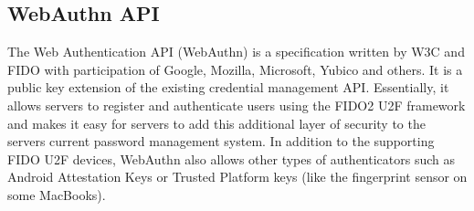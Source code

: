 \documentclass[acmtog,review]{acmart}
\begin{document}




\subsection{WebAuthn API}
The Web Authentication API (WebAuthn) is a specification written by W3C and FIDO with participation of Google, Mozilla, Microsoft, Yubico and others. It is a public key extension of the existing credential management API. Essentially, it allows servers to register and authenticate users using the FIDO2 U2F framework and makes it easy for servers to add this additional layer of security to the servers current password management system. In addition to the supporting FIDO U2F devices, WebAuthn also allows other types of authenticators such as Android Attestation Keys or Trusted Platform keys (like the fingerprint sensor on some MacBooks).
\end{document}

